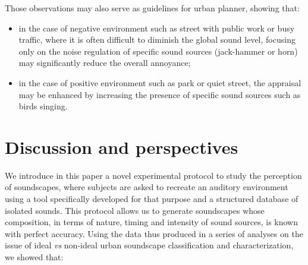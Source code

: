 \documentclass[twoside,twocolumn]{article}
\begin{document}
Those observations may also serve as guidelines for urban planner, showing that:

\begin{itemize}
\item in the case of negative environment such as street with public work or busy traffic, where it is often difficult to diminish the global sound level, focusing only on the noise regulation of specific sound sources (jack-hammer or horn) may significantly reduce the overall annoyance;
\item in the case of positive environment such as park or quiet street, the appraisal may be enhanced by increasing the presence of specific sound sources such as birds singing.
\end{itemize}

 

\section{Discussion and perspectives}


We introduce in this paper a novel experimental protocol to study the perception of soundscapes, where subjects are asked to recreate an auditory environment using a tool specifically developed for that purpose and a structured database of isolated sounds. This protocol allows us to generate soundscapes whose composition, in terms of nature, timing and intensity of sound sources, is known with perfect accuracy. Using the data thus produced in a series of analyses on the issue of ideal \emph{vs} non-ideal urban soundscape classification and characterization, we showed that:
\end{document}
